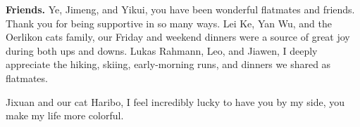 \noindent
\textbf{Friends.}
Ye, Jimeng, and Yikui, you have been wonderful flatmates and friends. Thank you for being supportive in so many ways. Lei Ke, Yan Wu, and the Oerlikon cats family, our Friday and weekend dinners were a source of great joy during both ups and downs. Lukas Rahmann, Leo, and Jiawen, I deeply appreciate the hiking, skiing, early-morning runs, and dinners we shared as flatmates.

Jixuan and our cat Haribo, I feel incredibly lucky to have you by my side, you make my life more colorful.


